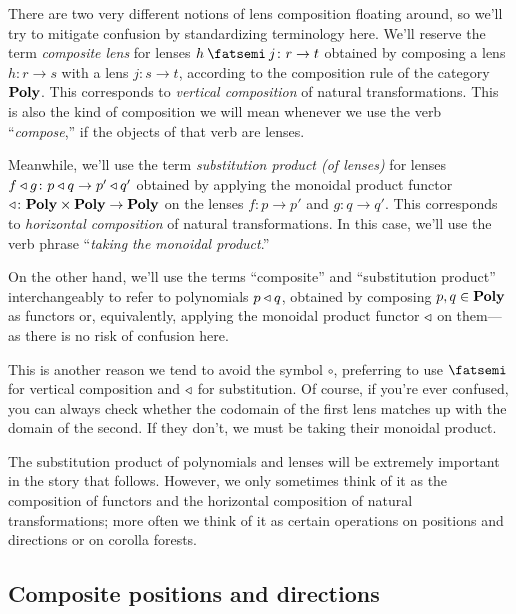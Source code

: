 \documentclass[Book-Poly]{subfiles}
\begin{document}
\begin{remark}
There are two very different notions of lens composition floating around, so we'll try to mitigate confusion by standardizing terminology here.
We'll reserve the term \emph{composite lens} for lenses $h\then j\colon r\to t$ obtained by composing a lens $h\colon r\to s$ with a lens $j\colon s\to t$, according to the composition rule of the category $\mathbf{Poly}$.
This corresponds to \emph{vertical composition} of natural transformations.
This is also the kind of composition we will mean whenever we use the verb ``\emph{compose},'' if the objects of that verb are lenses.

Meanwhile, we'll use the term \emph{substitution product (of lenses)} for lenses $f\mathbin{\triangleleft} g\colon p\mathbin{\triangleleft} q\to p'\mathbin{\triangleleft} q'$ obtained by applying the monoidal product functor $\mathbin{\triangleleft}\colon\mathbf{Poly}\times\mathbf{Poly}\to\mathbf{Poly}$ on the lenses $f\colon p\to p'$ and $g\colon q\to q'$.
This corresponds to \emph{horizontal composition} of natural transformations.
In this case, we'll use the verb phrase ``\emph{taking the monoidal product}.''

On the other hand, we'll use the terms ``composite'' and ``substitution product'' interchangeably to refer to polynomials $p\mathbin{\triangleleft} q$, obtained by composing $p,q\in\mathbf{Poly}$ as functors or, equivalently, applying the monoidal product functor $\mathbin{\triangleleft}$ on them---as there is no risk of confusion here.%

This is another reason we tend to avoid the symbol $\circ$, preferring to use $\then$ for vertical composition and $\mathbin{\triangleleft}$ for substitution.
Of course, if you're ever confused, you can always check whether the codomain of the first lens matches up with the domain of the second.
If they don't, we must be taking their monoidal product.
\end{remark}

The substitution product of polynomials and lenses will be extremely important in the story that follows.
However, we only sometimes think of it as the composition of functors and the horizontal composition of natural transformations; more often we think of it as certain operations on positions and directions or on corolla forests.

\subsection{Composite positions and directions}\label{subsec.comon.comp.def.arena}
\end{document}
